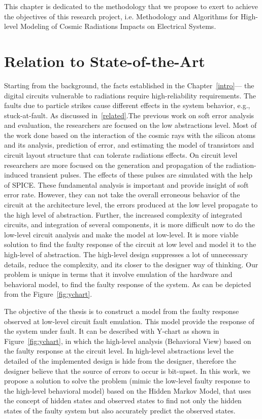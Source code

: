 

This chapter is dedicated to the methodology that we propose to exert to achieve the objectives of this research project, i.e. Methodology and Algorithms for High-level Modeling of Cosmic Radiations Impacts on Electrical Systems.

\section{Relation to State-of-the-Art}
Starting from the background, the facts established in the Chapter~\ref{intro}--- the digital circuits vulnerable to radiations require high-reliability requirements. The faults due to particle strikes cause different effects in the system behavior, e.g., stuck-at-fault. As discussed in~\ref{related}.The previous work on soft error analysis and evaluation, the researchers are focused on the low abstractions level. Most of the work done based on the interaction of the cosmic rays with the silicon atoms and its analysis, prediction of error,  and estimating the model of transistors and circuit layout structure that can tolerate radiations effects. On circuit level researchers are more focused on the generation and propagation of the radiation-induced transient pulses. The effects of these pulses are simulated with the help of SPICE. These fundamental analysis is important and provide insight of soft error rate. However, they can not take the overall erroneous behavior of the circuit at the architecture level, the errors produced at the low level propagate to the high level of abstraction. Further, the increased complexity of integrated circuits, and integration of several components, it is more difficult now to do the low-level circuit analysis and make the model at low-level. It is more viable solution to find the faulty response of the circuit at low level and model it to the high-level of abstraction. The high-level design suppresses a lot of unnecessary details, reduce the complexity, and its closer to the designer way of thinking. Our problem is unique in terms that it involve emulation of the hardware and behavioral model, to find the faulty response of the system. As can be depicted from the Figure~\ref{fig:ychart}.

The objective of the thesis is to construct a model from the faulty response observed at low-level circuit fault emulation. This model provide the response of the system under fault. It can be described with Y-chart as shown in Figure~\ref{fig:ychart}, in which the high-level analysis (Behavioral View) based on the faulty response at the circuit level. In high-level abstractions level the detailed of the implemented design is hide from the designer, therefore the designer believe that the source of errors to occur is bit-upset. In this work, we propose a solution to solve the problem (mimic the low-level faulty response to the high-level behavioral model) based on the Hidden Markov Model, that uses the concept of hidden states and observed states to find not only the hidden states of the faulty system but also accurately predict the observed states. 


